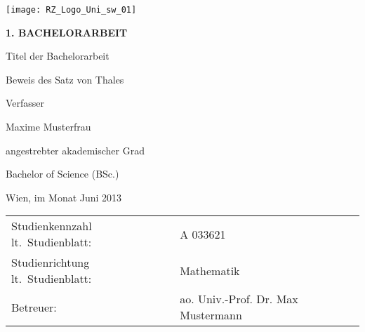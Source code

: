 \begin{titlepage}
\begin{flushright}
    \texttt{[image: RZ\_Logo\_Uni\_sw\_01]}
\end{flushright}
\vspace{1cm}

\begin{center}  %
    \Huge{\textbf{\textsf{\MakeUppercase{
        1. Bachelorarbeit
    }}}}
    \vspace{2cm}

    \large{\textsf{  %
        Titel der Bachelorarbeit
    }}
    \vspace{.1cm}

    \LARGE{\textsf{  Beweis des Satz von Thales
    }}
    \vspace{3cm}

    \large{\textsf{  %
        Verfasser
    }}

    \Large{\textsf{  Maxime Musterfrau
    }}
    \vspace{3cm}

    \large{\textsf{
        angestrebter akademischer Grad  %
    }}

    \Large{\textsf{  %
        Bachelor of Science (BSc.)
    }}
\end{center}
\vspace{2cm}

\noindent\textsf{Wien, im Monat Juni 2013}  %
\vfill

\noindent\begin{tabular}{@{}ll}
\textsf{Studienkennzahl lt.\ Studienblatt:}
&
\textsf{A 033621}  %
\\
\textsf{Studienrichtung lt.\ Studienblatt:}
&
\textsf{Mathematik}  %
\\
\textsf{Betreuer: }
&
\textsf{ao. Univ.-Prof. Dr. Max Mustermann}  %
\end{tabular}

\end{titlepage}